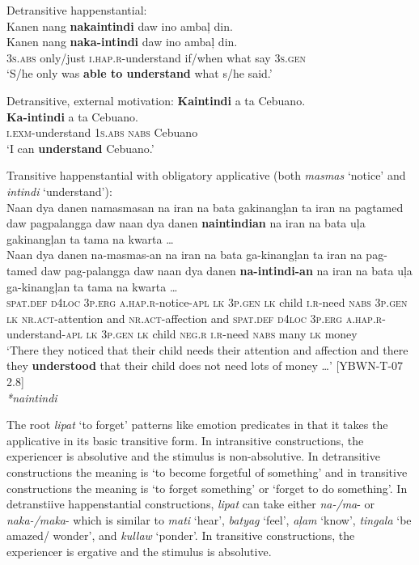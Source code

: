 \ea
Detransitive happenstantial: \\
Kanen  nang  \textbf{nakaintindi}  daw  ino  ambaļ  din. \\\smallskip
\gll Kanen  nang  \textbf{naka-intindi}  daw  ino  ambaļ  din. \\
3\textsc{s.abs}  only/just  \textsc{i.hap.r}-understand  if/when  what  say  3\textsc{s.gen} \\
\glt ‘S/he only was \textbf{able to understand} what s/he said.’
\z

\ea
Detransitive, external motivation:
\textbf{Kaintindi}  a  ta  Cebuano. \\\smallskip
\gll \textbf{Ka-intindi}  a  ta  Cebuano. \\
\textsc{i.exm}-understand  1\textsc{s.abs}  \textsc{nabs}  Cebuano \\
\glt ‘I can \textbf{understand} Cebuano.’
\z

\ea
Transitive happenstantial with obligatory applicative (both \textit{masmas} ‘notice’ and \textit{intindi} ‘understand’): \\
Naan  dya  danen  namasmasan  na  iran  na  bata  gakinangļan ta  iran  na  pagtamed  daw  pagpalangga  daw  naan  dya danen  \textbf{naintindian}  na  iran  na  bata  uļa  gakinangļan ta  tama  na  kwarta … \\\smallskip
\gll Naan  dya  danen  na-masmas-an  na  iran  na  bata  ga-kinangļan ta  iran  na  pag-tamed  daw  pag-palangga  daw  naan  dya danen  \textbf{na-intindi-an}  na  iran  na  bata  uļa  ga-kinangļan ta  tama  na  kwarta … \\
\textsc{spat.def}  \textsc{d4loc}  3\textsc{p.erg}  \textsc{a.hap.r}-notice-\textsc{apl}  \textsc{lk}  3\textsc{p.gen}  \textsc{lk}  child  \textsc{i.r}-need  \textsc{nabs}  3\textsc{p.gen}  \textsc{lk}  \textsc{nr.act}-attention  and  \textsc{nr.act}-affection  and  \textsc{spat.def}  \textsc{d4loc}
3\textsc{p.erg}  \textsc{a.hap.r}-understand-\textsc{apl}  \textsc{lk}  3\textsc{p.gen}  \textsc{lk}  child  \textsc{neg.r}  \textsc{i.r}-need
\textsc{nabs}  many  \textsc{lk}  money \\
\glt `There they noticed that their child needs their attention and affection and there they \textbf{understood} that their child does not need lots of money …’ [YBWN-T-07 2.8] \\\smallskip
\textit{*naintindi}
\z

The root \textit{lipat} ‘to forget’ patterns like emotion predicates in that it takes the applicative in its basic transitive form. In intransitive constructions, the experiencer is absolutive and the stimulus is non-absolutive. In detransitive constructions the meaning is ‘to become forgetful of something’ and in transitive constructions the meaning is ‘to forget something’ or ‘forget to do something’. In detranstiive happenstantial constructions, \textit{lipat} can take either \textit{na-/ma}- or \textit{naka-/maka}- which is similar to \textit{mati} `hear', \textit{batyag} `feel', \textit{aļam} `know', \textit{tingala} `be amazed/ wonder', and \textit{kullaw} `ponder'. In transitive constructions, the experiencer is ergative and the stimulus is absolutive.

